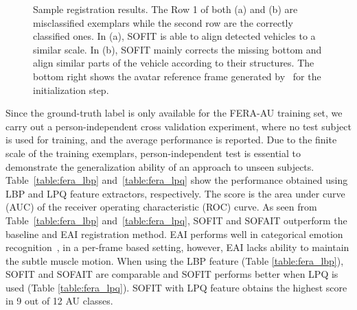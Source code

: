 \documentclass[10pt,journal]{IEEEtran}
\begin{document}
\begin{figure}[htbp]
	\centering


	\caption{Sample registration results. The Row 1 of both (a) and (b) are misclassified exemplars while the second row are the correctly classified ones. In (a), SOFIT is able to align detected vehicles to a similar scale. In (b), SOFIT mainly corrects the missing bottom and align similar parts of the vehicle according to their structures. The bottom right shows the avatar reference frame generated by~\cite{Yang_SMCB12} for the initialization step.}
	\label{fig:vehicle_reg_sample}
\end{figure}



Since the ground-truth label is only available for the FERA-AU training set, we carry out a person-independent cross validation experiment, where no test subject is used for training, and the average performance is reported. Due to the finite scale of the training exemplars, person-independent test is essential to demonstrate the generalization ability of an approach to unseen subjects. Table~\ref{table:fera_lbp} and~\ref{table:fera_lpq} show the performance obtained using LBP and LPQ feature extractors, respectively. The score is the area under curve (AUC) of the receiver operating characteristic (ROC) curve. As seen from Table~\ref{table:fera_lbp} and~\ref{table:fera_lpq}, SOFIT and SOFAIT outperform the baseline and EAI registration method. EAI performs well in categorical emotion recognition~\cite{Yang_SMCB12}, in a per-frame based setting, however, EAI lacks ability to maintain the subtle muscle motion. When using the LBP feature (Table \ref{table:fera_lbp}), SOFIT and SOFAIT are comparable and SOFIT performs better when LPQ is used (Table \ref{table:fera_lpq}). SOFIT with LPQ feature obtains the highest score in 9 out of 12 AU classes. 
\end{document}
